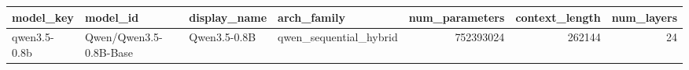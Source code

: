 \begin{tabular}{llllrrr}
\toprule
model_key & model_id & display_name & arch_family & num_parameters & context_length & num_layers \\
\midrule
qwen3.5-0.8b & Qwen/Qwen3.5-0.8B-Base & Qwen3.5-0.8B & qwen_sequential_hybrid & 752393024 & 262144 & 24 \\
\bottomrule
\end{tabular}
